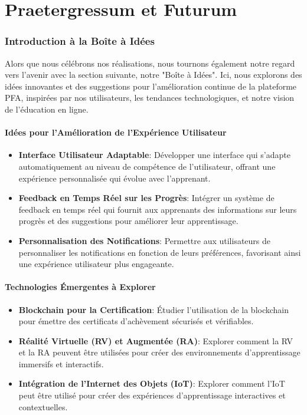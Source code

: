 \newpage

\part{Praetergressum et Futurum}

\section{Introduction à la Boîte à Idées}

\label{part:ideabox}
Alors que nous célébrons nos réalisations, nous tournons également notre regard vers l'avenir avec la section suivante, notre "Boîte à Idées". Ici, nous explorons des idées innovantes et des suggestions pour l'amélioration continue de la plateforme PFA, inspirées par nos utilisateurs, les tendances technologiques, et notre vision de l'éducation en ligne.

\subsection{Idées pour l'Amélioration de l'Expérience Utilisateur}
\begin{itemize}[leftmargin=*,label=\textbullet,font=\color{violet}]
    \item \textbf{Interface Utilisateur Adaptable}: Développer une interface qui s'adapte automatiquement au niveau de compétence de l'utilisateur, offrant une expérience personnalisée qui évolue avec l'apprenant.
    \item \textbf{Feedback en Temps Réel sur les Progrès}: Intégrer un système de feedback en temps réel qui fournit aux apprenants des informations sur leurs progrès et des suggestions pour améliorer leur apprentissage.
    \item \textbf{Personnalisation des Notifications}: Permettre aux utilisateurs de personnaliser les notifications en fonction de leurs préférences, favorisant ainsi une expérience utilisateur plus engageante.
\end{itemize}

\subsection{Technologies Émergentes à Explorer}
\begin{itemize}[leftmargin=*,label=\textbullet,font=\color{violet}]
    \item \textbf{Blockchain pour la Certification}: Étudier l'utilisation de la blockchain pour émettre des certificats d'achèvement sécurisés et vérifiables.
    \item \textbf{Réalité Virtuelle (RV) et Augmentée (RA)}: Explorer comment la RV et la RA peuvent être utilisées pour créer des environnements d'apprentissage immersifs et interactifs.
    \item \textbf{Intégration de l'Internet des Objets (IoT)}: Explorer comment l'IoT peut être utilisé pour créer des expériences d'apprentissage interactives et contextuelles.
\end{itemize}

